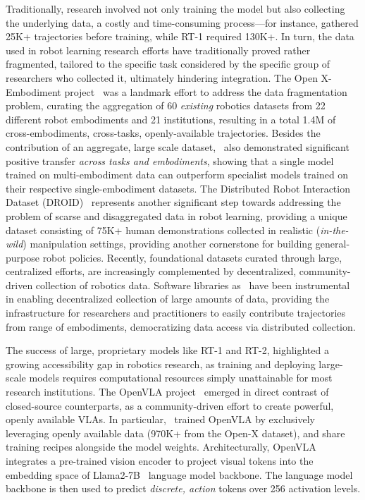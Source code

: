 Traditionally, research involved not only training the model but also collecting the underlying data, a costly and time-consuming process—for instance, \citet{jangBCZZeroShotTask2022} gathered 25K+ trajectories before training, while RT-1 required 130K+.
In turn, the data used in robot learning research efforts have traditionally proved rather fragmented, tailored to the specific task considered by the specific group of researchers who collected it, ultimately hindering integration.
The Open X-Embodiment project~\citep{OpenXEmbodimentRobotic} was a landmark effort to address the data fragmentation problem, curating the aggregation of 60 \emph{existing} robotics datasets from 22 different robot embodiments and 21 institutions, resulting in a total 1.4M of cross-embodiments, cross-tasks, openly-available trajectories.
Besides the contribution of an aggregate, large scale dataset,~\citet{OpenXEmbodimentRobotic} also demonstrated significant positive transfer \emph{across tasks and embodiments}, showing that a single model trained on multi-embodiment data can outperform specialist models trained on their respective single-embodiment datasets.
The Distributed Robot Interaction Dataset (DROID)~\citep{DROIDLargeScaleIntheWild} represents another significant step towards addressing the problem of scarse and disaggregated data in robot learning, providing a unique dataset consisting of 75K+ human demonstrations collected in realistic (\emph{in-the-wild}) manipulation settings, providing another cornerstone for building general-purpose robot policies.
Recently, foundational datasets curated through large, centralized efforts, are increasingly complemented by decentralized, community-driven collection of robotics data.
Software libraries as \lerobot~have been instrumental in enabling decentralized collection of large amounts of data, providing the infrastructure for researchers and practitioners to easily contribute trajectories from range of embodiments, democratizing data access via distributed collection.

The success of large, proprietary models like RT-1 and RT-2, highlighted a growing accessibility gap in robotics research, as training and deploying large-scale models requires computational resources simply unattainable for most research institutions. 
The OpenVLA project~\citep{kimOpenVLAOpenSourceVisionLanguageAction2024} emerged in direct contrast of closed-source counterparts, as a community-driven effort to create powerful, openly available VLAs.
In particular,~\citet{kimOpenVLAOpenSourceVisionLanguageAction2024} trained OpenVLA by exclusively leveraging openly available data (970K+ from the Open-X dataset), and share training recipes alongside the model weights.
Architecturally, OpenVLA integrates a pre-trained vision encoder to project visual tokens into the embedding space of Llama2-7B~\citep{touvronLlama2Open2023} language model backbone.
The language model backbone is then used to predict \emph{discrete, action} tokens over 256 activation levels.  


